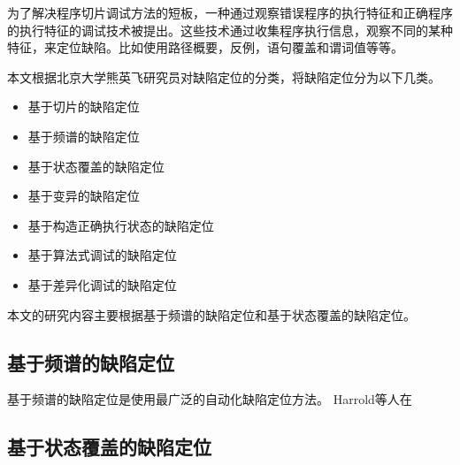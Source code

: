 为了解决程序切片调试方法的短板，一种通过观察错误程序的执行特征和正确程序的执行特征的调试技术被提出。这些技术通过收集程序执行信息，观察不同的某种特征，来定位缺陷。比如使用路径概要\parencite{Reps1997The}，反例\parencite{Ball2003From,Groce2004Understanding}，语句覆盖\parencite{Jones2002Visualization}和谓词值\parencite{Liblit2005Scalable,Liu2005SOBER}等等。

本文根据北京大学熊英飞研究员对缺陷定位的分类\parencite{YingfeiFL}，将缺陷定位分为以下几类。

\begin{itemize}
\item 基于切片的缺陷定位
\item 基于频谱的缺陷定位
\item 基于状态覆盖的缺陷定位
\item 基于变异的缺陷定位
\item 基于构造正确执行状态的缺陷定位
\item 基于算法式调试的缺陷定位
\item 基于差异化调试的缺陷定位
\end{itemize}

本文的研究内容主要根据基于频谱的缺陷定位和基于状态覆盖的缺陷定位。

\subsection{基于频谱的缺陷定位}

基于频谱的缺陷定位是使用最广泛的自动化缺陷定位方法\parencite{YingfeiFL}。
Harrold等人在

\subsection{基于状态覆盖的缺陷定位}
